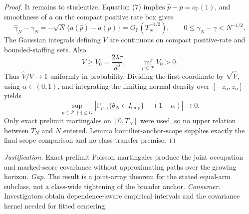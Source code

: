 \documentclass{article}
\begin{document}
\begin{proof}
It remains to studentize.  Equation (7) implies \(\widehat p-p=o_{\mathbb P}(1)\), and smoothness of \(a\) on the compact positive rate box gives
\[
 \widehat\gamma_N-\gamma_N
 =-\sqrt N\{a(\widehat p)-a(p)\}=O_{\mathbb P}(T_N^{-1/2}),
 \qquad 0\leq\gamma_N-\gamma<N^{-1/2}.                       \tag{18}
\]
The Gaussian integrals defining \(V\) are continuous on compact positive-rate and bounded-staffing sets.  Also
\[
 V\geq V_0=\frac{2\lambda\tau}{d^3},
 \qquad \inf_{p\in\mathcal P}V_0>0.                          \tag{19}
\]
Thus \(\widehat V/V\to1\) uniformly in probability.  Dividing the first coordinate by \(\sqrt{\widehat V}\), using \(\alpha\in(0,1)\), and integrating the limiting normal density over \([-z_\alpha,z_\alpha]\) yields
\[
 \sup_{p\in\mathcal P,\,|\gamma|\leq G}
 \left|\mathbb P_{p,\gamma}\{\theta_N\in I_{\mathrm{emp}}\}-(1-\alpha)\right|
 \longrightarrow0.                                           \tag{20}
\]
Only exact prelimit martingales on \([0,T_N]\) were used, so no upper relation between \(T_N\) and \(N\) entered.  Lemma \(\mathrm{boutilier\mbox{-}anchor\mbox{-}scope}\) supplies exactly the final scope comparison and no class-transfer premise.
\end{proof}
\par\smallskip\noindent \textit{Justification.} Exact prelimit Poisson martingales produce the joint occupation and marked-score covariance without approximating paths over the growing horizon. \textit{Gap.} The result is a joint-array theorem for the stated equal-arm subclass, not a class-wide tightening of the broader anchor. \textit{Consumer.} Investigators obtain dependence-aware empirical intervals and the covariance kernel needed for fitted centering.
\end{document}
